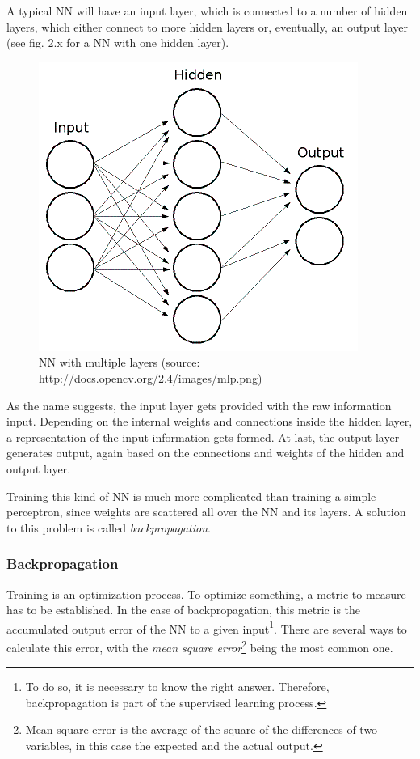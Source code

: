 A typical NN will have an input layer, which is connected to a number of hidden layers, which either connect to more hidden layers or, eventually, an output layer (see fig. 2.x for a NN with one hidden layer).

\begin{figure}[H]
	\begin{center}
		\includegraphics[scale=0.8]{img/mlp.png}
		\caption{NN with multiple layers (source: http://docs.opencv.org/2.4/\textunderscore images/mlp.png)}
		\label{fig:fig2.2}
	\end{center}
\end{figure}

As the name suggests, the input layer gets provided with the raw information input. Depending on the internal weights and connections inside the hidden layer, a representation of the input information gets formed. At last, the output layer generates output, again based on the connections and weights of the hidden and output layer\cite{Stergiou96}.

Training this kind of NN is much more complicated than training a simple perceptron, since weights are scattered all over the NN and its layers. A solution to this problem is called \emph{backpropagation}\cite{Shiffman12}.


\subsubsection{Backpropagation}
Training is an optimization process. To optimize something, a metric to measure has to be established. In the case of backpropagation, this metric is the accumulated output error of the NN to a given input\footnote{To do so, it is necessary to know the right answer. Therefore, backpropagation is part of the supervised learning process.}. There are several ways to calculate this error, with the \emph{mean square error}\footnote{Mean square error is the average of the square of the differences of two variables, in this case the expected and the actual output.} being the most common one\cite{Bourg04}.

